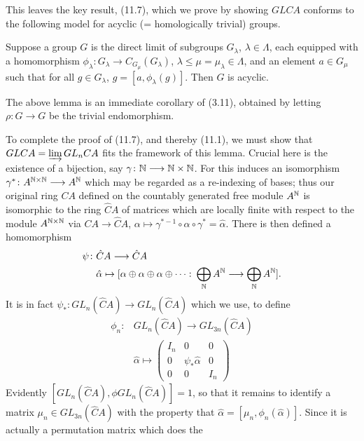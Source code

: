 This leaves the key result, (11.7), which we prove by showing $GLCA$ conforms to the following model for acyclic (= homologically trivial) groups.
\begin{lemma}
  Suppose a group $G$ is the direct limit of subgroups $G_\lambda$, $\lambda \in \Lambda$, each equipped with a homomorphism $\phi_\lambda\colon   G_\lambda \longrightarrow  C_{G_\mu}(G_\lambda)$, $\lambda \leqslant \mu = \mu_\lambda \in \Lambda$, and an element $a \in G_\mu$ such that for all $g\in G_\lambda$, $g=[a, \phi_\lambda(g)]$. Then $G$ is acyclic.
\end{lemma}
The above lemma is an immediate corollary of (3.11), obtained by letting $\rho \colon   G\longrightarrow G$ be the trivial endomorphism.

To complete the proof of (11.7), and thereby (11.1), we must show that $GLCA = \varinjlim GL_nCA$ fits the framework of this lemma. Crucial here is the existence of a bijection, say $\gamma \colon   \mathbb{N} \longrightarrow  \mathbb{N} \times \mathbb{N}$.
For this induces an isomorphism $\gamma^* \colon   A^{\mathbb{N}\times \mathbb{N}} \longrightarrow  A^{\mathbb{N}}$ which may be regarded as a re-indexing of bases; thus our original ring $CA$ defined on the countably generated free module $A^{\mathbb{N}}$ is isomorphic to the ring $\hat{C}A$ of matrices which are locally finite with respect to the module $A^{\mathbb{N} \times \mathbb{N}}$ via $CA \longrightarrow \hat{C}A$, $\alpha \mapsto \gamma^{*-1}\circ \alpha \circ \gamma^* =\hat{\alpha}$. There is then defined a homomorphism
\begin{align*}
\psi \colon  & \hat{C}A \longrightarrow \hat{C}A \\
   & \hat{\alpha} \mapsto [\alpha \oplus  \alpha \oplus \alpha \oplus \cdots\colon   \bigoplus_{\mathbb{N}} A^{\mathbb{N}} \longrightarrow \bigoplus_{\mathbb{N}} A^{\mathbb{N}} ].
\end{align*}
It is in fact $\psi_* \colon   GL_n(\hat{C}A) \longrightarrow  GL_n(\hat{C}A)$ which we use, to define
\begin{align*}
  \phi_n\colon  & GL_n(\hat{C}A)\longrightarrow GL_{3n}(\hat{C}A) \\
  & \hat{\alpha} \mapsto \begin{pmatrix}
    I_n & 0 & 0\\
    0 & \psi_*\hat{\alpha} & 0\\
    0 & 0& I_n
  \end{pmatrix}
\end{align*}
Evidently $[GL_n(\hat{C}A), \phi GL_n(\hat{C}A)] = 1$, so that it remains to identify a matrix $\mu_n \in GL_{3n}(\hat{C}A)$ with the property that $\hat{\alpha} = [\mu_n, \phi_n(\hat{\alpha})]$. Since it is actually a permutation matrix which does the
